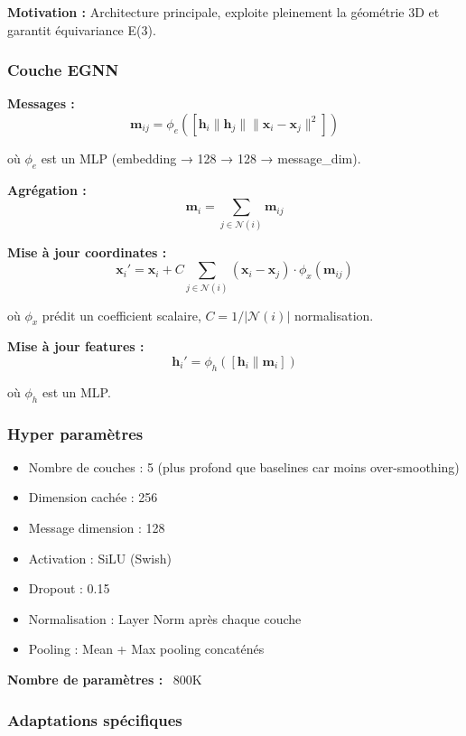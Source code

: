 \textbf{Motivation :}
Architecture principale, exploite pleinement la géométrie 3D et garantit équivariance E(3).

\subsubsection{Couche EGNN}

\textbf{Messages :}
\[
\mathbf{m}_{ij} = \phi_e\left([\mathbf{h}_i \| \mathbf{h}_j \| \|\mathbf{x}_i - \mathbf{x}_j\|^2]\right)
\]

où $\phi_e$ est un MLP (embedding → 128 → 128 → message\_dim).

\textbf{Agrégation :}
\[
\mathbf{m}_i = \sum_{j \in \mathcal{N}(i)} \mathbf{m}_{ij}
\]

\textbf{Mise à jour coordinates :}
\[
\mathbf{x}_i' = \mathbf{x}_i + C \sum_{j \in \mathcal{N}(i)} (\mathbf{x}_i - \mathbf{x}_j) \cdot \phi_x(\mathbf{m}_{ij})
\]

où $\phi_x$ prédit un coefficient scalaire, $C = 1/|\mathcal{N}(i)|$ normalisation.

\textbf{Mise à jour features :}
\[
\mathbf{h}_i' = \phi_h([\mathbf{h}_i \| \mathbf{m}_i])
\]

où $\phi_h$ est un MLP.

\subsubsection{Hyper paramètres}

\begin{itemize}
    \item Nombre de couches : 5 (plus profond que baselines car moins over-smoothing)
    \item Dimension cachée : 256
    \item Message dimension : 128
    \item Activation : SiLU (Swish)
    \item Dropout : 0.15
    \item Normalisation : Layer Norm après chaque couche
    \item Pooling : Mean + Max pooling concaténés
\end{itemize}

\textbf{Nombre de paramètres :} ~800K

\subsubsection{Adaptations spécifiques}


